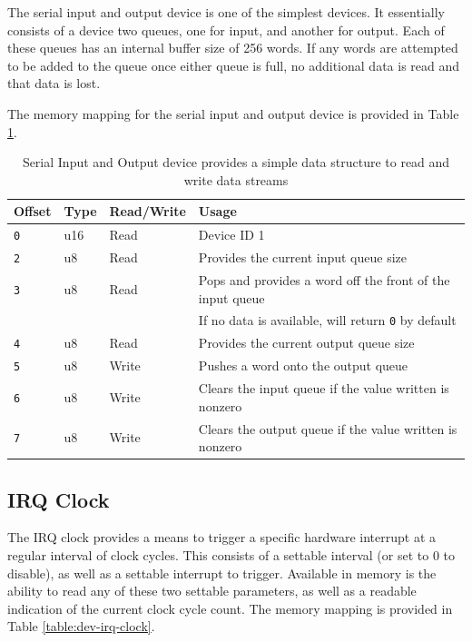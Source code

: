 \documentclass{article}
\begin{document}
The serial input and output device is one of the simplest devices. It essentially consists of a device two queues, one for input, and another for output. Each of these queues has an internal buffer size of 256 words. If any words are attempted to be added to the queue once either queue is full, no additional data is read and that data is lost.

The memory mapping for the serial input and output device is provided in Table \ref{table:dev-serial-io}.

\begin{table}[h!]
    \centering
    \begin{tabular}{l|lll}
        \hline
        Offset & Type & Read/Write & Usage \\
        \hline
        \texttt{0} & u16 & Read & Device ID 1 \\
        \texttt{2} & u8 & Read & Provides the current input queue size \\
        \texttt{3} & u8 & Read & Pops and provides a word off the front of the input queue \\
        & & & If no data is available, will return \texttt{0} by default \\
        \texttt{4} & u8 & Read & Provides the current output queue size \\
        \texttt{5} & u8 & Write & Pushes a word onto the output queue \\
        \texttt{6} & u8 & Write & Clears the input queue if the value written is nonzero \\
        \texttt{7} & u8 & Write & Clears the output queue if the value written is nonzero \\
        \hline
    \end{tabular}
    \caption{Serial Input and Output device provides a simple data structure to read and write data streams}
    \label{table:dev-serial-io}
\end{table}

\subsection{IRQ Clock}

The IRQ clock provides a means to trigger a specific hardware interrupt at a regular interval of clock cycles. This consists of a settable interval (or set to 0 to disable), as well as a settable interrupt to trigger. Available in memory is the ability to read any of these two settable parameters, as well as a readable indication of the current clock cycle count. The memory mapping is provided in Table \ref{table:dev-irq-clock}.
\end{document}
